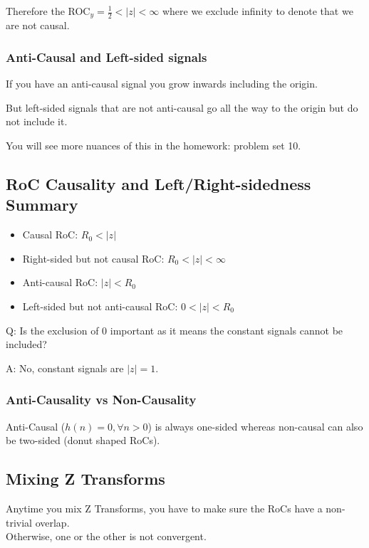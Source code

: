 Therefore the ROC$_y = \frac12<|z|<\infty$ where we exclude infinity to denote that we are not causal.

\subsubsection{Anti-Causal and Left-sided signals}
If you have an anti-causal signal you grow inwards including the origin.

But left-sided signals that are not anti-causal go all the way to the origin but do not include it.

You will see more nuances of this in the homework: problem set 10.

\subsection{RoC Causality and Left/Right-sidedness Summary}
\begin{itemize}
    \item Causal RoC: $R_0<|z|$
    \item Right-sided but not causal RoC: $R_0<|z|<\infty$
    \item Anti-causal RoC: $|z|<R_0$
    \item Left-sided but not anti-causal RoC: $0<|z|<R_0$
\end{itemize}
\begin{shaded}
Q: Is the exclusion of 0 important as it means the constant signals cannot be included?
\end{shaded}
A: No, constant signals are $|z|=1$.

\subsubsection{Anti-Causality vs Non-Causality}
Anti-Causal ($h(n)=0,\forall n>0$) is always one-sided 
whereas non-causal can also be two-sided (donut shaped RoCs).

\subsection{Mixing Z Transforms}
Anytime you mix Z Transforms, you have to make sure the RoCs have a non-trivial overlap.\\
Otherwise, one or the other is not convergent.

